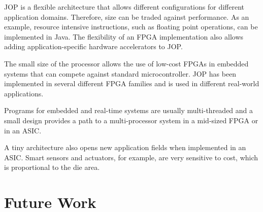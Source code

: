 JOP is a flexible architecture that allows different configurations
for different application domains. Therefore, size can be traded
against performance. As an example, resource intensive instructions,
such as floating point operations, can be implemented in Java. The
flexibility of an FPGA implementation also allows adding
application-specific hardware accelerators to JOP.

The small size of the processor allows the use of low-cost FPGAs in
embedded systems that can compete against standard microcontroller.
JOP has been implemented in several different FPGA families and is
used in different real-world applications.

Programs for embedded and real-time systems are usually
multi-threaded and a small design provides a path to a
multi-processor system in a mid-sized FPGA or in an ASIC.

A tiny architecture also opens new application fields when
implemented in an ASIC. Smart sensors and actuators, for example,
are very sensitive to cost, which is proportional to the die area.


\section{Future Work}


